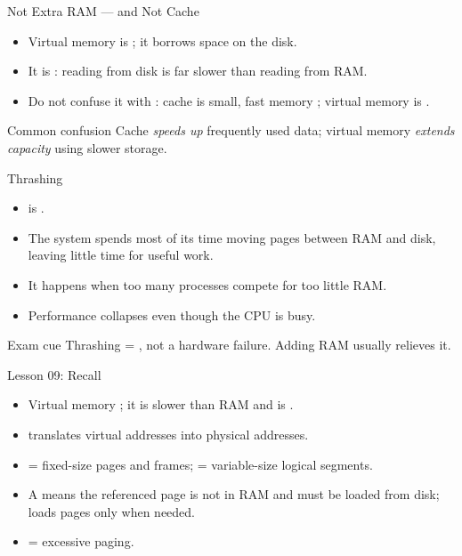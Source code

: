 \documentclass[aspectratio=169]{beamer}
\begin{document}
\begin{frame}{Not Extra RAM --- and Not Cache}
  \begin{itemize}
    \item Virtual memory is ; it borrows
      space on the disk.
    \item It is : reading from disk is far slower than
      reading from RAM.
    \item Do not confuse it with : cache is small, fast memory
      ; virtual memory is .
  \end{itemize}
  \begin{alertblock}{Common confusion}
    Cache \textit{speeds up} frequently used data; virtual memory
    \textit{extends capacity} using slower storage.
  \end{alertblock}
\end{frame}

\begin{frame}{Thrashing}
  \begin{itemize}
    \item {} is .
    \item The system spends most of its time moving pages between RAM and
      disk, leaving little time for useful work.
    \item It happens when too many processes compete for too little RAM.
    \item Performance collapses even though the CPU is busy.
  \end{itemize}
  \begin{block}{Exam cue}
    Thrashing = , not a hardware failure. Adding RAM
    usually relieves it.
  \end{block}
\end{frame}

\begin{frame}{Lesson 09: Recall}
  \begin{itemize}
    \item Virtual memory ; it is slower than
      RAM and is .
    \item {} translates virtual addresses into physical addresses.
    \item {} = fixed-size pages and frames;  =
      variable-size logical segments.
    \item A  means the referenced page is not in RAM and must
      be loaded from disk;  loads pages only when needed.
    \item {} = excessive paging.
  \end{itemize}
\end{frame}
\end{document}

